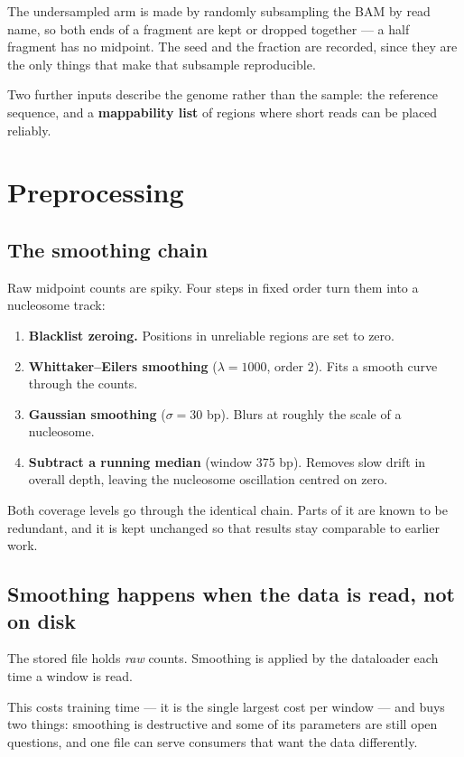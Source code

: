 \documentclass[11pt,a4paper]{article}
\begin{document}
The undersampled arm is made by randomly subsampling the BAM by read name, so both
ends of a fragment are kept or dropped together --- a half fragment has no midpoint.
The seed and the fraction are recorded, since they are the only things that make
that subsample reproducible.

Two further inputs describe the genome rather than the sample: the reference
sequence, and a \textbf{mappability list} of regions where short reads can be
placed reliably.

\section{Preprocessing}

\subsection{The smoothing chain}

Raw midpoint counts are spiky. Four steps in fixed order turn them into a
nucleosome track:

\begin{enumerate}
\item \textbf{Blacklist zeroing.} Positions in unreliable regions are set to zero.
\item \textbf{Whittaker--Eilers smoothing} ($\lambda = 1000$, order 2). Fits a
      smooth curve through the counts.
\item \textbf{Gaussian smoothing} ($\sigma = 30$ bp). Blurs at roughly the scale of
      a nucleosome.
\item \textbf{Subtract a running median} (window 375 bp). Removes slow drift in
      overall depth, leaving the nucleosome oscillation centred on zero.
\end{enumerate}

Both coverage levels go through the identical chain. Parts of it are known to be
redundant, and it is kept unchanged so that results stay comparable to earlier work.

\subsection{Smoothing happens when the data is read, not on disk}

The stored file holds \emph{raw} counts. Smoothing is applied by the dataloader
each time a window is read.

This costs training time --- it is the single largest cost per window --- and buys
two things: smoothing is destructive and some of its parameters are still open
questions, and one file can serve consumers that want the data differently.
\end{document}
